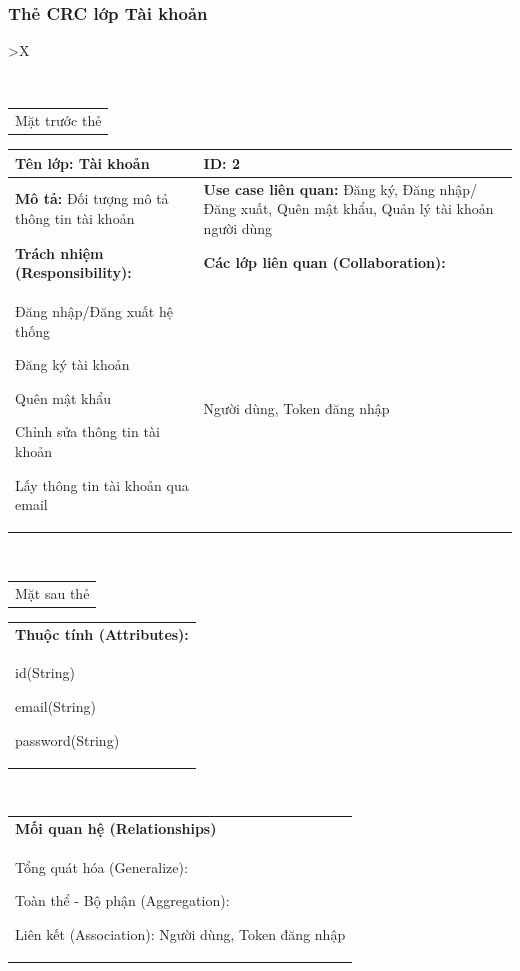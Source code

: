   \subsubsection{Thẻ CRC lớp Tài khoản}
  \begin{xltabular}{\textwidth}{
    >{\centering\arraybackslash}X 
   }
   \caption{\bfseries \fontsize{12pt}{0pt}\selectfont Thẻ CRC lớp Tài khoản}
   \\
   \begin{tabularx}{0.9\textwidth}{X}
     Mặt trước thẻ
   \end{tabularx}
   \begin{tabularx}{0.9\textwidth}{|X|X|}
     \hline
     \textbf{Tên lớp:} Tài khoản & \textbf{ID:} 2 \\
      \hline
      \textbf{Mô tả:} Đối tượng mô tả thông tin tài khoản & \textbf{Use case liên quan:} Đăng ký, Đăng nhập/Đăng xuất, Quên mật khẩu, Quản lý tài khoản người dùng \\
      \hline
      \textbf{Trách nhiệm (Responsibility):} & \textbf{Các lớp liên quan (Collaboration):} \\
      Đăng nhập/Đăng xuất hệ thống

      Đăng ký tài khoản

      Quên mật khẩu

      Chỉnh sửa thông tin tài khoản

      Lấy thông tin tài khoản qua email
      & 
      Người dùng, Token đăng nhập
      \\
     \hline
   \end{tabularx}
   \\ 
   \begin{tabularx}{0.9\textwidth}{X}
     Mặt sau thẻ
   \end{tabularx}
   \begin{tabularx}{0.9\textwidth}{|X|}
    \hline
    \textbf{Thuộc tính (Attributes):} \\
    id(String) 
    
    email(String)

    password(String)
    \\
    \hline
  \end{tabularx}
   \\     
   \begin{tabularx}{0.9\textwidth}{|X|}
     \textbf{Mối quan hệ (Relationships)} \\
     Tổng quát hóa (Generalize):  

     Toàn thể - Bộ phận (Aggregation):   
     
     Liên kết (Association): Người dùng, Token đăng nhập      \\
     \hline
   \end{tabularx}
   \end{xltabular}
   

